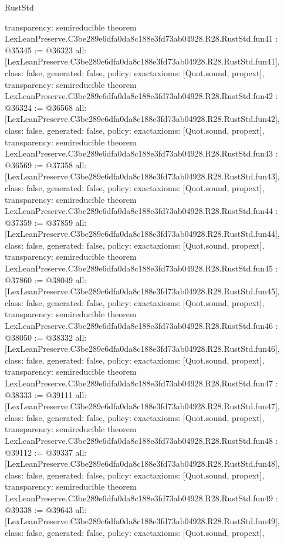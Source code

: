 \begin{lexlean}{RustStd}
\begin{coremodule}
{  transparency: semireducible
}
theorem LexLeanPreserve.C3be289e6dfa0da8c188e3fd73ab04928.R28.RustStd.fun41 : @35345 := @36323 {
  all: [LexLeanPreserve.C3be289e6dfa0da8c188e3fd73ab04928.R28.RustStd.fun41],
  class: false,
  generated: false,
  policy: exact{axioms: [Quot.sound, propext]},
  transparency: semireducible
}
theorem LexLeanPreserve.C3be289e6dfa0da8c188e3fd73ab04928.R28.RustStd.fun42 : @36324 := @36568 {
  all: [LexLeanPreserve.C3be289e6dfa0da8c188e3fd73ab04928.R28.RustStd.fun42],
  class: false,
  generated: false,
  policy: exact{axioms: [Quot.sound, propext]},
  transparency: semireducible
}
theorem LexLeanPreserve.C3be289e6dfa0da8c188e3fd73ab04928.R28.RustStd.fun43 : @36569 := @37358 {
  all: [LexLeanPreserve.C3be289e6dfa0da8c188e3fd73ab04928.R28.RustStd.fun43],
  class: false,
  generated: false,
  policy: exact{axioms: [Quot.sound, propext]},
  transparency: semireducible
}
theorem LexLeanPreserve.C3be289e6dfa0da8c188e3fd73ab04928.R28.RustStd.fun44 : @37359 := @37859 {
  all: [LexLeanPreserve.C3be289e6dfa0da8c188e3fd73ab04928.R28.RustStd.fun44],
  class: false,
  generated: false,
  policy: exact{axioms: [Quot.sound, propext]},
  transparency: semireducible
}
theorem LexLeanPreserve.C3be289e6dfa0da8c188e3fd73ab04928.R28.RustStd.fun45 : @37860 := @38049 {
  all: [LexLeanPreserve.C3be289e6dfa0da8c188e3fd73ab04928.R28.RustStd.fun45],
  class: false,
  generated: false,
  policy: exact{axioms: [Quot.sound, propext]},
  transparency: semireducible
}
theorem LexLeanPreserve.C3be289e6dfa0da8c188e3fd73ab04928.R28.RustStd.fun46 : @38050 := @38332 {
  all: [LexLeanPreserve.C3be289e6dfa0da8c188e3fd73ab04928.R28.RustStd.fun46],
  class: false,
  generated: false,
  policy: exact{axioms: [Quot.sound, propext]},
  transparency: semireducible
}
theorem LexLeanPreserve.C3be289e6dfa0da8c188e3fd73ab04928.R28.RustStd.fun47 : @38333 := @39111 {
  all: [LexLeanPreserve.C3be289e6dfa0da8c188e3fd73ab04928.R28.RustStd.fun47],
  class: false,
  generated: false,
  policy: exact{axioms: [Quot.sound, propext]},
  transparency: semireducible
}
theorem LexLeanPreserve.C3be289e6dfa0da8c188e3fd73ab04928.R28.RustStd.fun48 : @39112 := @39337 {
  all: [LexLeanPreserve.C3be289e6dfa0da8c188e3fd73ab04928.R28.RustStd.fun48],
  class: false,
  generated: false,
  policy: exact{axioms: [Quot.sound, propext]},
  transparency: semireducible
}
theorem LexLeanPreserve.C3be289e6dfa0da8c188e3fd73ab04928.R28.RustStd.fun49 : @39338 := @39643 {
  all: [LexLeanPreserve.C3be289e6dfa0da8c188e3fd73ab04928.R28.RustStd.fun49],
  class: false,
  generated: false,
  policy: exact{axioms: [Quot.sound, propext]},
}
\end{coremodule}
\end{lexlean}
